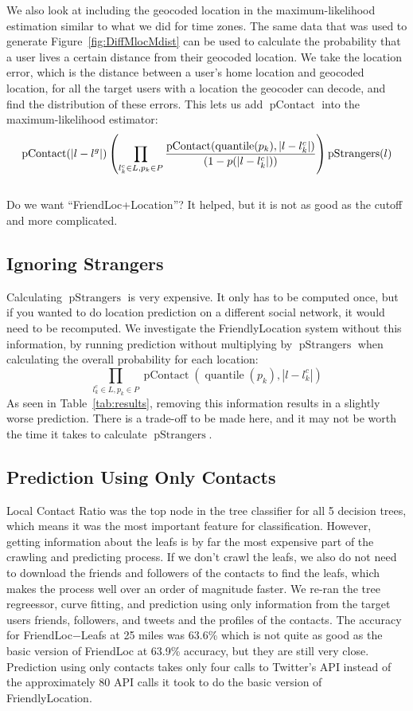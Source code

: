 \documentclass[letterpaper]{article}
\DeclareMathOperator{\pContact}{pContact}
\DeclareMathOperator{\pLocation}{pContact}
\DeclareMathOperator{\pStrangers}{pStrangers}
\DeclareMathOperator{\quantile}{quantile}
\begin{document}
We also look at including the geocoded location in the maximum-likelihood
estimation similar to what we did for time zones.
%
The same data that was used to generate Figure~\ref{fig:DiffMlocMdist} can be
used to calculate the probability that a user lives a certain distance from
their geocoded location.
%
We take the location error, which is the distance between a user's home
location and geocoded location, for all the target users with a location the
geocoder can decode, and find the distribution of these errors.
%
This lets us add $\pLocation$ into the maximum-likelihood estimator:
\[
    \pLocation(|l-l^g|)
    \left(
        \prod_{l^c_k \in L,p_k \in P}
        {\pContact(\quantile(p_k),|l-l^c_k|) \over (1-p(|l-l^c_k|))}
    \right)
    \pStrangers(l)
\]
\\{Do we want ``FriendLoc+Location''? It helped, but it is not as good as the
    cutoff and more complicated.}


\subsection{Ignoring Strangers}
Calculating $\pStrangers$ is very expensive.
%
It only has to be computed once, but if you wanted to do location prediction on
a different social network, it would need to be recomputed.
%
We investigate the FriendlyLocation system without this information, by running
prediction without multiplying by $\pStrangers$ when calculating the overall
probability for each location:
\[
    \prod_{l^c_k \in L,p_k \in P} \pContact(\quantile(p_k),|l-l^c_k|)
\]
As seen in Table~\ref{tab:results}, removing this information results in a
slightly worse prediction.
%
There is a trade-off to be made here, and it may not be worth the time it takes
to calculate $\pStrangers$.

\subsection{Prediction Using Only Contacts}
Local Contact Ratio was the top node in the tree classifier for all 5 decision
trees, which means it was the most important feature for classification.
%
However, getting information about the leafs is by far the most expensive part
of the crawling and predicting process.
%
If we don't crawl the leafs, we also do not need to download the friends and
followers of the contacts to find the leafs, which makes the process well over
an order of magnitude faster.
%
We re-ran the tree regreessor, curve fitting, and prediction using only
information from the target users friends, followers, and tweets and the
profiles of the contacts.
%
The accuracy for FriendLoc$-$Leafs at 25 miles was 63.6\% which is not quite as
good as the basic version of FriendLoc at 63.9\% accuracy, but they are still
very close.
%
Prediction using only contacts takes only four calls to Twitter's API instead
of the approximately 80 API calls it took to do the basic version of
FriendlyLocation.
\end{document}
